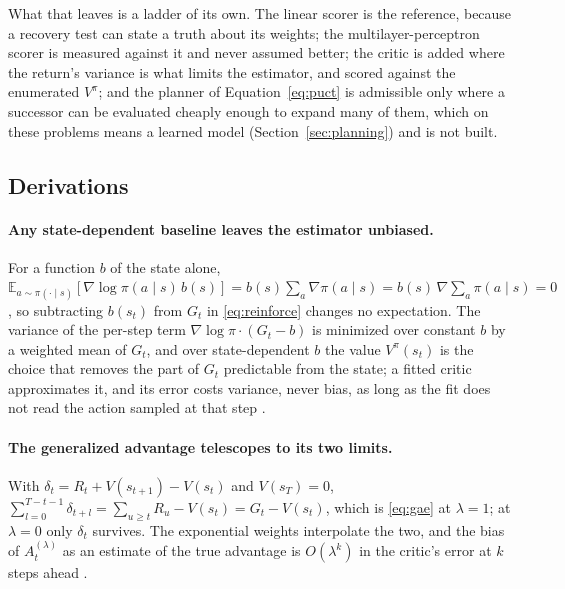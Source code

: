 \documentclass[11pt,a4paper]{article}
\begin{document}
What that leaves is a ladder of its own. The linear scorer is the reference,
because a recovery test can state a truth about its weights; the
multilayer-perceptron scorer is measured against it and never assumed better;
the critic is added where the return's variance is what limits the estimator,
and scored against the enumerated $V^{\pi}$; and the planner of
Equation~\ref{eq:puct} is admissible only where a successor can be evaluated
cheaply enough to expand many of them, which on these problems means a learned
model (Section~\ref{sec:planning}) and is not built.

\subsection{Derivations}
\label{app:rl:derivations}

\paragraph{Any state-dependent baseline leaves the estimator unbiased.}
For a function $b$ of the state alone,
$\mathbb{E}_{a \sim \pi(\cdot \mid s)}[\nabla \log \pi(a \mid s)\, b(s)]
= b(s) \sum_a \nabla \pi(a \mid s) = b(s)\, \nabla \sum_a \pi(a \mid s) = 0$,
so subtracting $b(s_t)$ from $G_t$ in \eqref{eq:reinforce} changes no
expectation. The variance of the per-step term $\nabla \log \pi \cdot (G_t - b)$
is minimized over constant $b$ by a weighted mean of $G_t$, and over
state-dependent $b$ the value $V^\pi(s_t)$ is the choice that removes the part
of $G_t$ predictable from the state; a fitted critic approximates it, and its
error costs variance, never bias, as long as the fit does not read the action
sampled at that step \citep{suttonbarto2018}.

\paragraph{The generalized advantage telescopes to its two limits.}
With $\delta_t = R_t + V(s_{t+1}) - V(s_t)$ and $V(s_T) = 0$,
$\sum_{l=0}^{T-t-1} \delta_{t+l} = \sum_{u \ge t} R_u - V(s_t) = G_t - V(s_t)$,
which is \eqref{eq:gae} at $\lambda = 1$; at $\lambda = 0$ only $\delta_t$
survives. The exponential weights interpolate the two, and the bias of
$A_t^{(\lambda)}$ as an estimate of the true advantage is
$O(\lambda^{k})$ in the critic's error at $k$ steps ahead
\citep{schulman2016}.
\end{document}
